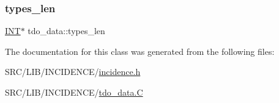 \subsubsection{\texorpdfstring{types\+\_\+len}{types\_len}}
{\footnotesize\ttfamily \mbox{\hyperlink{galois_8h_a09fddde158a3a20bd2dcadb609de11dc}{I\+NT}}$\ast$ tdo\+\_\+data\+::types\+\_\+len}



The documentation for this class was generated from the following files\+:\begin{DoxyCompactItemize}
\item 
S\+R\+C/\+L\+I\+B/\+I\+N\+C\+I\+D\+E\+N\+C\+E/\mbox{\hyperlink{incidence_8h}{incidence.\+h}}\item 
S\+R\+C/\+L\+I\+B/\+I\+N\+C\+I\+D\+E\+N\+C\+E/\mbox{\hyperlink{tdo__data_8_c}{tdo\+\_\+data.\+C}}\end{DoxyCompactItemize}
